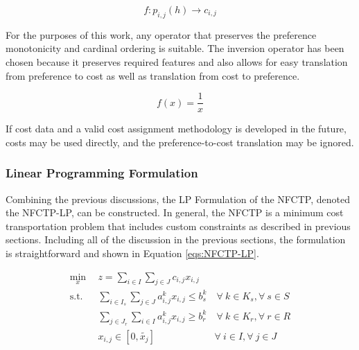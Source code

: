 \begin{equation}
f : p_{i,j}(h) \to c_{i,j}
\end{equation}

\noindent
For the purposes of this work, any operator that preserves the preference
monotonicity and cardinal ordering is suitable.  The inversion operator has been
chosen because it preserves required features and also allows for easy
translation from preference to cost as well as translation from cost to
preference.

\begin{equation}
f(x) = \frac{1}{x}
\end{equation}

If cost data and a valid cost assignment methodology is developed in the future,
costs may be used directly, and the preference-to-cost translation may be
ignored.

\subsubsection{Linear Programming Formulation}\label{abm:dre:lp}

Combining the previous discussions, the LP Formulation of the NFCTP, denoted the
NFCTP-LP, can be constructed. In general, the NFCTP is a minimum cost
transportation problem that includes custom constraints as described in previous
sections. Including all of the discussion in the previous sections, the
formulation is straightforward and shown in Equation \ref{eqs:NFCTP-LP}.

\begin{subequations}\label{eqs:NFCTP-LP}
  \begin{align}
    \min_{x} \:\: 
    & 
    z = \sum_{i \in I}\sum_{j \in J}c_{i,j} x_{i,j} 
    & 
    \label{eqs:NFCTP-LP_obj} \\
    \text{s.t.} \:\: 
    &
    \sum_{i \in I_s} \sum_{j \in J} a^k_{i,j} x_{i,j} \leq b^k_s 
    &
    \: 
    \forall \: k \in K_s, 
    \forall \: s \in S 
    \label{eqs:NFCTP-LP_sup} \\
    &
    \sum_{j \in J_r} \sum_{i \in I} a^k_{i,j} x_{i,j} \geq b^k_r 
    &
    \: 
    \forall \: k \in K_r,  
    \forall \: r \in R 
    \label{eqs:NFCTP-LP_req} \\
    &
    x_{i,j} \in [0, \tilde{x_j}]
    &
    \forall \: i \in I, 
    \forall \: j \in J 
    \label{eqs:NFCTP-LP_x}
  \end{align}
\end{subequations}

